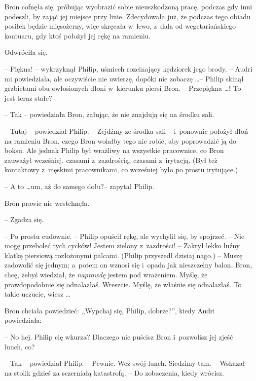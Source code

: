 \documentclass[oneside,polish,11pt,rmheadings]{mwbk}
\begin{document}
Bron cofnęła się, próbując wyobrazić sobie nieuszkodzoną pracę, podczas gdy inni podeszli, by zająć jej miejsce przy linie. Zdecydowała już, że podczas tego obiadu posiłek będzie mięsożerny, więc skręcała w~lewo, z~dala od wegetariańskiego kontuaru, gdy ktoś położył jej rękę na ramieniu. 

Odwróciła się. 

-- Piękna!  -- wykrzyknął Philip, uśmiech rozcinający kędziorek jego brody. -- Audri mi powiedziała, ale oczywiście nie uwierzę, dopóki nie zobaczę \ldots  -- Philip skinął grzbietami obu owłosionych dłoni w~kierunku piersi Bron. -- Przepiękna \ldots ! To jest teraz stałe? 

-- Tak -- powiedziała Bron, żałując, że nie znajdują się na środku sali. 

-- Tutaj -- powiedział Philip. -- Zejdźmy ze środka sali --  i~ponownie położył dłoń na ramieniu Bron, czego Bron wolałby tego nie robić, aby poprowadzić ją do boksu. Ale jednak Philip był wrażliwy na wszystkie pracownice, co Bron zauważył wcześniej, czasami z~zazdrością, czasami z~irytacją. (Był też kontaktowy z~męskimi pracownikami, co wcześniej było po prostu irytujące.) 

-- A to \ldots  um, aż do samego dołu?--  zapytał Philip. 

Bron prawie nie westchnęła. 

-- Zgadza się. 

-- Po prostu cudownie. -- Philip opuścił rękę, ale wychylił się, by spojrzeć. -- Nie mogę przeboleć tych cycków! Jestem zielony z~zazdrości! -- Zakrył lekko luźny klatkę piersiową rozłożonymi palcami. (Philip przyszedł dzisiaj nago.) -- Muszę zadowolić się jednym; a~potem on wznosi się i~opada jak nieszczelny balon. Bron, chcę, żebyś wiedział, że \textit{naprawdę }jestem pod wrażeniem. Myślę, że prawdopodobnie się odnalazłaś. Wreszcie. Myślę, że właśnie się odnalazłaś. To takie uczucie, wiesz \ldots  

Bron chciała powiedzieć:  ,,Wypchaj się, Philip, dobrze?'', kiedy Audri powiedziała: 

-- No hej. Philip cię wkurza? Dlaczego nie puścisz Bron i~pozwolisz jej zjeść lunch, co? 

-- Tak -- powiedział Philip. -- Pewnie. Weź swój lunch. Siedzimy tam. -- Wskazał na stolik gdzieś za sczerniałą katastrofą. -- Do zobaczenia, kiedy wrócisz. 
\end{document}
